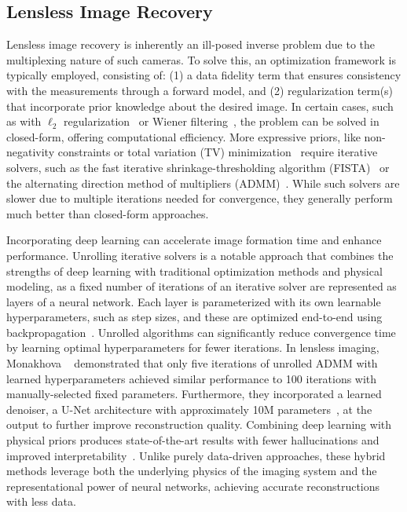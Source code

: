 \subsection{Lensless Image Recovery}

\noindent Lensless image recovery is inherently an ill-posed inverse problem due to the multiplexing nature of such cameras.
To solve this, an optimization framework is typically employed, consisting of: (1) a data fidelity term that ensures consistency with the measurements through a forward model, and (2) regularization term(s) that incorporate prior knowledge about the desired image.
In certain cases, such as with $\ell_2$ regularization~\cite{flatcam} or Wiener filtering~\cite{Li:23}, 
the problem can be solved in closed-form, offering computational efficiency. 
More expressive priors, like non-negativity constraints or total variation (TV) minimization~\cite{Antipa:18,phlatcam} require iterative solvers, such as the fast iterative shrinkage-thresholding algorithm (FISTA)~\cite{beck2009fast} or the alternating direction method of multipliers (ADMM)~\cite{ADMM}.
While such solvers are slower due to multiple iterations needed for convergence,
they generally perform much better than closed-form approaches.

Incorporating deep learning can accelerate image formation time and enhance performance.
Unrolling iterative solvers is a notable approach that combines the strengths of deep learning with traditional optimization methods and physical modeling,
as a fixed number of iterations of an iterative solver are represented as layers of a neural network. 
Each layer is parameterized with its own learnable hyperparameters, such as step sizes, and these are optimized end-to-end using backpropagation~\cite{lista}.
Unrolled algorithms can significantly reduce convergence time by learning optimal hyperparameters for fewer iterations.
In lensless imaging, Monakhova \etal~\cite{Monakhova:19} demonstrated that only five iterations of unrolled ADMM with learned hyperparameters achieved similar performance to 100 iterations with manually-selected fixed parameters.
Furthermore, they incorporated a learned denoiser, a U-Net architecture with approximately 10M parameters~\cite{unet}, at the output to further improve reconstruction quality.
Combining deep learning with physical priors produces state-of-the-art results with fewer hallucinations and improved interpretability~\cite{9239993,Perron2023}.
Unlike purely data-driven approaches, these hybrid methods leverage both the underlying physics of the imaging system and the representational power of neural networks, achieving accurate reconstructions with less data.

